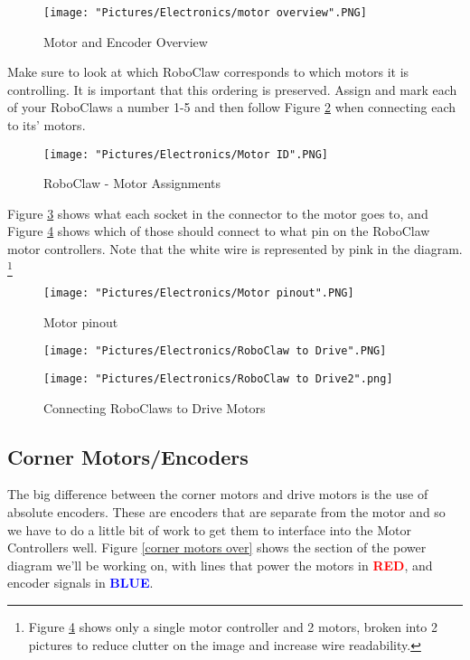 \documentclass[12pt]{article}
\begin{document}
\begin{figure}[H]
  	\centering
    	\texttt{[image: "Pictures/Electronics/motor overview".PNG]}
 	\caption{Motor and Encoder Overview}
	\label{motors over}
\end{figure}


\noindent Make sure to look at which RoboClaw corresponds to which motors it is controlling. It is important that this ordering is preserved. Assign and mark each of your RoboClaws a number 1-5 and then follow Figure \ref{motorID} when connecting each to its' motors. 

\begin{figure}[H]
 	\centering
	\texttt{[image: "Pictures/Electronics/Motor ID".PNG]}
 	\caption{RoboClaw - Motor Assignments}
	\label{motorID}
\end{figure}

Figure \ref{Motor pinout} shows what each socket in the connector to the motor goes to, and Figure \ref{RC to Drive} shows which of those should connect to what pin on the RoboClaw motor controllers. Note that the white wire is represented by pink in the diagram. \footnote{Figure \ref{RC to Drive} shows only a single motor controller and 2 motors, broken into 2 pictures to reduce clutter on the image and increase wire readability.} 
\begin{figure}[H]
 	\centering
	\texttt{[image: "Pictures/Electronics/Motor pinout".PNG]}
 	\caption{Motor pinout}
	\label{Motor pinout}
\end{figure}


\begin{figure}[H]
 	\centering
  	\begin{minipage}[b]{0.475\textwidth}
		\texttt{[image: "Pictures/Electronics/RoboClaw to Drive".PNG]}
  	\end{minipage}
  	\hfill
  	\begin{minipage}[b]{0.425\textwidth}
    		\texttt{[image: "Pictures/Electronics/RoboClaw to Drive2".png]}
  	\end{minipage}
	\caption{Connecting RoboClaws to Drive Motors}
	\label{RC to Drive}
\end{figure}

\subsection{Corner Motors/Encoders}
The big difference between the corner motors and drive motors is the use of absolute encoders. These are encoders that are separate from the motor and so we have to do a little bit of work to get them to interface into the Motor Controllers well. Figure \ref{corner motors over} shows the section of the power diagram we'll be working on, with lines that power the motors in \textcolor{red}{\textbf{RED}}, and encoder signals in \textcolor{blue}{\textbf{BLUE}}.
\end{document}
